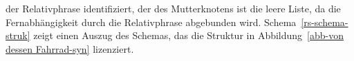 der Relativphrase identifiziert, der \slashw des Mutterknotens ist die leere Liste, da die Fernabhängigkeit
durch die Relativphrase abgebunden wird. Schema~\vref{rs-schema-struk} zeigt einen Auszug des Schemas, das die Struktur in 
Abbildung~\ref{abb-von dessen Fahrrad-syn} lizenziert.
\begin{samepage}
\begin{schema}
\label{rs-schema-struk}
 \impl\\
\end{schema}
\end{samepage}

